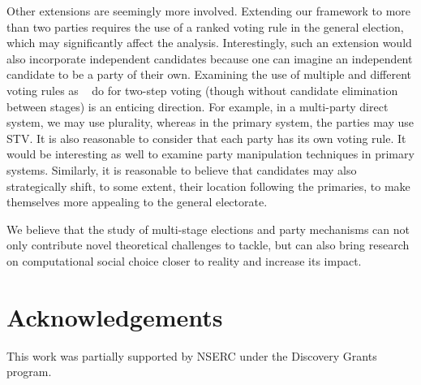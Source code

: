 \documentclass[letterpaper]{article} %
\newcommand{\citet}[1]{\citeauthor{#1}~\shortcite{#1}}
\theoremstyle{definition}
\begin{document}
Other extensions are seemingly more involved. Extending our framework to more than two parties requires the use of a ranked voting rule in the general election, which may significantly affect the analysis. Interestingly, such an extension would also incorporate independent candidates because one can imagine an independent candidate to be a party of their own. Examining the use of multiple and different voting rules as \citet{NW13} do for two-step voting (though without candidate elimination between stages) is an enticing direction. For example, in a multi-party direct system, we may use plurality, whereas in the primary system, the parties may use STV. It is also reasonable to consider that each party has its own voting rule. It would be interesting as well to examine party manipulation techniques in primary systems. Similarly, it is reasonable to believe that candidates may also strategically shift, to some extent, their location following the primaries, to make themselves more appealing to the general electorate. 

We believe that the study of multi-stage elections and party mechanisms can not only contribute novel theoretical challenges to tackle, but can also bring research on computational social choice closer to reality and increase its impact. 

\section{Acknowledgements}
This work was partially supported by NSERC under the Discovery Grants program.
\small


\end{document}
